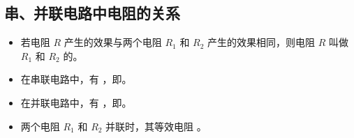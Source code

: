 \subsection{串、并联电路中电阻的关系}
\begin{itemize}
\item 若电阻 $R$ 产生的效果与两个电阻 $R_1$ 和 $R_2$ 产生的效果相同，则电阻 $R$ 叫做 $R_1$ 和 $R_2$ 的。
\item 在串联电路中，有 ，即。
\item 在并联电路中，有 ，即。
\item 两个电阻 $R_1$ 和 $R_2$ 并联时，其等效电阻 。
\end{itemize}